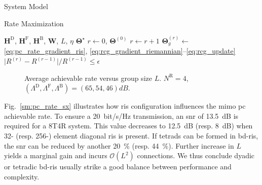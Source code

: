 \documentclass[journal]{IEEEtran}
\makeatletter
\newcommand\setalgorithmcaptionfont[1]{%
	\let\my@floatc@ruled\floatc@ruled          %
	\def\floatc@ruled{%
		\global\let\floatc@ruled\my@floatc@ruled %
		#1\floatc@ruled}}
\makeatother
\begin{document}
\begin{section}{System Model}
\begin{subsection}{Rate Maximization}
		\setalgorithmcaptionfont{\small}
		\begin{algorithm}[!t]
			\small
			\caption{\gls{rcg} Method for \gls{ris} \gls{mimo}-\gls{pc} Rate Maximization}
			\label{ag:pc_rate_ris}
			\begin{algorithmic}[1]
				\Require $\mathbf{H}^\mathrm{D}$, $\mathbf{H}^\mathrm{F}$, $\mathbf{H}^\mathrm{B}$, $\mathbf{W}$, $L$, $\eta$
				\Ensure $\mathbf{\Theta}^\star$
				\State $r \gets 0$, $\mathbf{\Theta}^{(0)}$
				\Repeat
					\State $r \gets r+1$
						\State $\mathbf{\Theta}_g^{(r)} \gets$ \eqref{eq:pc_rate_gradient_ris}, \eqref{eq:rcg_gradient_riemannian}--\eqref{eq:rcg_update}
					\EndFor
				\Until $\lvert R^{(r)} - R^{(r-1)} \rvert / R^{(r-1)} \le \epsilon$
			\end{algorithmic}
		\end{algorithm}

		\begin{figure}[!t]
			\centering
			\subfloat[\gls{ris} Elements, $N^\mathrm{T} = 8$\label{sm:pc_rate_sx}]{
				\resizebox{0.48\columnwidth}{!}{
					
				}
			}
			\subfloat[Transmit Antenna, $N^\mathrm{S} = 256$\label{sm:pc_rate_tx}]{
				\resizebox{0.48\columnwidth}{!}{
					
				}
			}
			\caption{Average achievable rate versus group size $L$. $N^\mathrm{R} = 4$, $(\Lambda^\mathrm{D}, \Lambda^\mathrm{F}, \Lambda^\mathrm{B}) = (65, 54, 46) \unit{dB}$.}
			\label{sm:pc_rate}
		\end{figure}

		Fig.~\ref{sm:pc_rate_sx} illustrates how \gls{ris} configuration influences the \gls{mimo} \gls{pc} achievable rate.
		To ensure a \qty{20}{bit/s/Hz} transmission, an \gls{snr} of \qty{13.5}{\dB} is required for a 8T4R system.
		This value decreases to \qty{12.5}{\dB} (resp. \qty{8}{\dB}) when 32- (resp. 256-) element diagonal \gls{ris} is present.
		If tetrads can be formed in \gls{bd}-\gls{ris}, the \gls{snr} can be reduced by another \qty{20}{\percent} (resp. \qty{44}{\percent}).
		Further increase in $L$ yields a marginal gain and incurs $\mathcal{O}(L^2)$ connections.
		We thus conclude dyadic or tetradic \gls{bd}-\gls{ris} usually strike a good balance between performance and complexity.
	\end{subsection}

\end{section}
\end{document}
